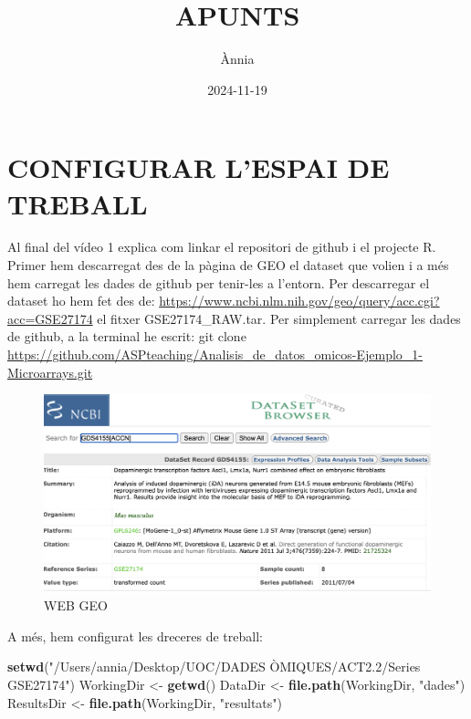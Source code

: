 \documentclass[
]{article}
\title{APUNTS}
\author{Ànnia}
\date{2024-11-19}
\newenvironment{Shaded}{\begin{snugshade}}{\end{snugshade}}
\newcommand{\FunctionTok}[1]{\textcolor[rgb]{0.13,0.29,0.53}{\textbf{#1}}}
\newcommand{\NormalTok}[1]{#1}
\newcommand{\OtherTok}[1]{\textcolor[rgb]{0.56,0.35,0.01}{#1}}
\newcommand{\StringTok}[1]{\textcolor[rgb]{0.31,0.60,0.02}{#1}}
\begin{document}
\maketitle

\section{CONFIGURAR L'ESPAI DE
TREBALL}\label{configurar-lespai-de-treball}

Al final del vídeo 1 explica com linkar el repositori de github i el
projecte R. Primer hem descarregat des de la pàgina de GEO el dataset
que volien i a més hem carregat les dades de github per tenir-les a
l'entorn. Per descarregar el dataset ho hem fet des de:
\url{https://www.ncbi.nlm.nih.gov/geo/query/acc.cgi?acc=GSE27174} el
fitxer GSE27174\_RAW.tar. Per simplement carregar les dades de github, a
la terminal he escrit: git clone
\url{https://github.com/ASPteaching/Analisis_de_datos_omicos-Ejemplo_1-Microarrays.git}

\begin{figure}
\centering
\includegraphics{images/clipboard-1792697817.png}
\caption{WEB GEO}
\end{figure}

A més, hem configurat les dreceres de treball:

\begin{Shaded}
\begin{Highlighting}[]
\FunctionTok{setwd}\NormalTok{(}\StringTok{"/Users/annia/Desktop/UOC/DADES ÒMIQUES/ACT2.2/Series GSE27174"}\NormalTok{)}
\NormalTok{WorkingDir }\OtherTok{\textless{}{-}} \FunctionTok{getwd}\NormalTok{()}
\NormalTok{DataDir }\OtherTok{\textless{}{-}} \FunctionTok{file.path}\NormalTok{(WorkingDir, }\StringTok{"dades"}\NormalTok{)}
\NormalTok{ResultsDir }\OtherTok{\textless{}{-}} \FunctionTok{file.path}\NormalTok{(WorkingDir, }\StringTok{"resultats"}\NormalTok{)}
\end{Highlighting}
\end{Shaded}
\end{document}
